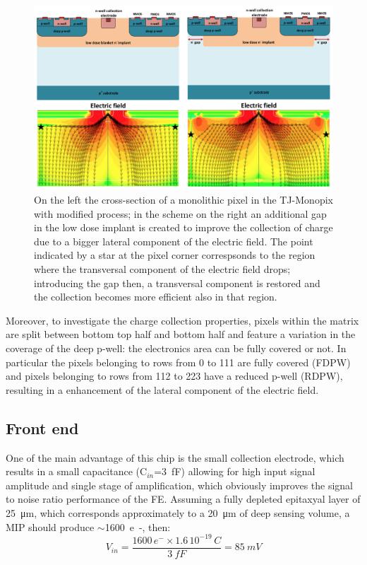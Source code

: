     \begin{figure}[h!]
        \centering
        \includegraphics[width=.9\linewidth]{figures/Monopix1/Monopix1_section_scheme.png}
        \caption{On the left the cross-section of a monolithic pixel in the TJ-Monopix with modified process; in the scheme on the right an additional gap in the low dose implant is created to improve the collection of charge due to a bigger lateral component of the electric field. The point indicated by a star at the pixel corner correspsonds to the region where the transversal component of the electric field drops; introducing the gap then, a transversal component is restored and the collection becomes more efficient also in that region. }
        \label{fig:Monopix1_section_scheme}
    \end{figure}

    Moreover, to investigate the charge collection properties, pixels within the matrix are split between bottom top half and bottom half and feature a variation in the coverage of the deep p-well: the electronics area can be fully covered or not. In particular the pixels belonging to rows from 0 to 111 are fully covered (FDPW) and pixels belonging to rows from 112 to 223 have a reduced p-well (RDPW), resulting in a enhancement of the lateral component of the electric field.

    \subsection{Front end}\label{sec:ALPIDE-like}
        One of the main advantage of this chip is the small collection electrode, which results in a small capacitance (C$_{in}$=\SI{3}{fF}) allowing for high input signal amplitude and single stage of amplification, which obviously improves the signal to noise ratio performance of the FE. Assuming a fully depleted epitaxyal layer of \SI{25}{\um}, which corresponds approximately to a \SI{20}{\um} of deep sensing volume, a MIP should produce $\sim$\SI{1600}{e-}, then:
        \begin{equation}
            V_{in} = \frac{1600\,e^-\times1.6\,10^{-19}\,\si{C} }{\SI{3}{fF}} = \SI{85}{mV}
        \end{equation}

